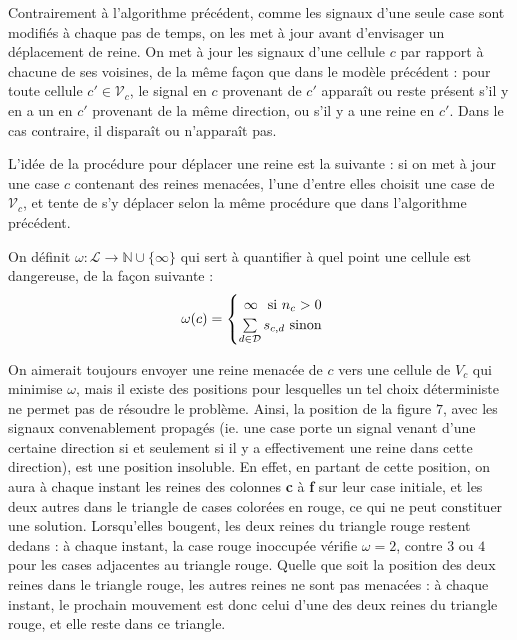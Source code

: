 \documentclass[11pt, openany]{article}
\newcommand{\N}{\mathbb{N}}
\newcommand{\La}{\mathcal{L}}
\newcommand{\D}{\mathcal{D}}
\newcommand{\E}{\mathcal{E}}
\newcommand{\V}{\mathcal V}
\begin{document}

\bigskip

Contrairement à l'algorithme précédent, comme les signaux d'une seule case sont modifiés à chaque pas de temps, on les met à jour avant d'envisager un déplacement de reine. On met à jour les signaux d'une cellule $c$ par rapport à chacune de ses voisines, de la même façon que dans le modèle précédent : pour toute cellule $c'\in\V_c$, le signal en $c$ provenant de $c'$ apparaît ou reste présent s'il y en a un en $c'$ provenant de la même direction, ou s'il y a une reine en $c'$. Dans le cas contraire, il disparaît ou n'apparaît pas.
\bigskip

L'idée de la procédure pour déplacer une reine est la suivante : si on met à jour une case $c$ contenant des reines menacées, l'une d'entre elles choisit une case de $\V_c$, et tente de s'y déplacer selon la même procédure que dans l'algorithme précédent. 

On définit $\omega : \La\to\N\cup\{\infty\}$ qui sert à quantifier à quel point une cellule est dangereuse, de la façon suivante : \[
\omega(c) = 
\begin{cases}
  \hfill \infty \hfill \text{ si $n_c > 0$}\\
  \hfill \sum\limits_{d\in\D}s_{c,d} \hfill \text{ sinon}
\end{cases}
\]

On aimerait toujours envoyer une reine menacée de $c$ vers une cellule de $V_c$ qui minimise $\omega$, mais il existe des positions pour lesquelles un tel choix déterministe ne permet pas de résoudre le problème. Ainsi, la position de la figure $7$, avec les signaux convenablement propagés (ie. une case porte un signal venant d'une certaine direction si et seulement si il y a effectivement une reine dans cette direction), est une position insoluble. En effet, en partant de cette position, on aura à chaque instant les reines des colonnes \textbf c à \textbf f sur leur case initiale, et les deux autres dans le triangle de cases colorées en rouge, ce qui ne peut constituer une solution. 
Lorsqu'elles bougent, les deux reines du triangle rouge restent dedans : à chaque instant, la case rouge inoccupée vérifie $\omega = 2$, contre $3$ ou $4$ pour les cases adjacentes au triangle rouge. Quelle que soit la position des deux reines dans le triangle rouge, les autres reines ne sont pas menacées : à chaque instant, le prochain mouvement est donc celui d'une des deux reines du triangle rouge, et elle reste dans ce triangle.
\end{document}
